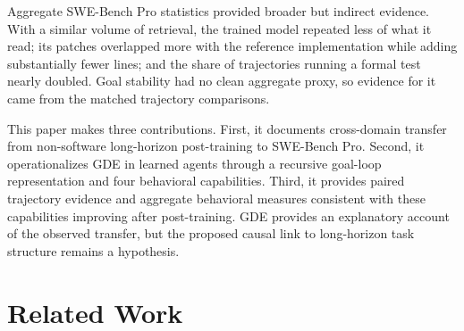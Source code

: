 \documentclass{article}
\begin{document}
Aggregate SWE-Bench Pro statistics provided broader but indirect evidence. With a similar volume of retrieval, the trained model repeated less of what it read; its patches overlapped more with the reference implementation while adding substantially fewer lines; and the share of trajectories running a formal test nearly doubled. Goal stability had no clean aggregate proxy, so evidence for it came from the matched trajectory comparisons.

This paper makes three contributions. First, it documents cross-domain transfer from non-software long-horizon post-training to SWE-Bench Pro. Second, it operationalizes GDE in learned agents through a recursive goal-loop representation and four behavioral capabilities. Third, it provides paired trajectory evidence and aggregate behavioral measures consistent with these capabilities improving after post-training. GDE provides an explanatory account of the observed transfer, but the proposed causal link to long-horizon task structure remains a hypothesis.

\section{Related Work}
\label{sec:related}
\end{document}
